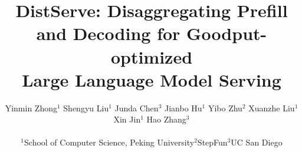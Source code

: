 \documentclass[letterpaper,twocolumn,10pt]{article}
\newcommand{\sys}[0]{DistServe\xspace}
\begin{document}
\date{}

\title{\sys: Disaggregating Prefill and Decoding for Goodput-optimized \\
Large Language Model Serving}

\author{
\rm{Yinmin Zhong$^{\text{1}}$ \enskip
    Shengyu Liu$^{\text{1}}$ \enskip
    Junda Chen$^{\text{3}}$ \enskip
    Jianbo Hu$^{\text{1}}$ \enskip
    Yibo Zhu$^{\text{2}}$  \enskip
    Xuanzhe Liu$^{\text{1}}$ \enskip
    }
\\
\rm{
    Xin Jin$^{\text{1}}$ \enskip
    Hao Zhang$^{\text{3}}$ \enskip
    }\\
\\
{$^{\text{1}}$School of Computer Science, Peking University\enskip $^{\text{2}}$StepFun\enskip $^{\text{3}}$UC San Diego\enskip}
}

\maketitle












\balance




\end{document}
